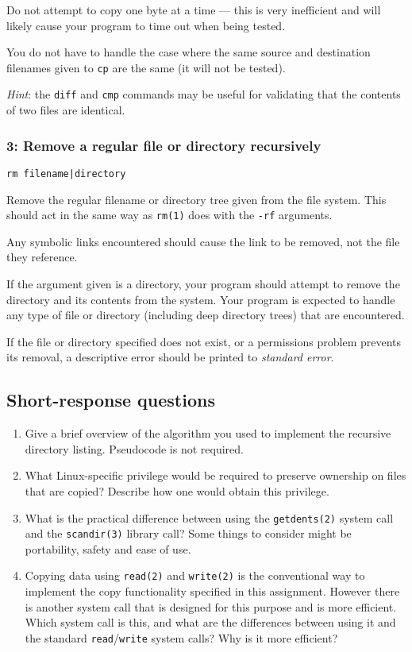 \documentclass[12pt,a4paper]{article}
\begin{document}
Do not attempt to copy one byte at a time --- this is very inefficient and will
likely cause your program to time out when being tested.

You do not have to handle the case where the same source and destination filenames
given to \texttt{cp} are the same (it will not be tested).

\textit{Hint}: the \texttt{diff} and \texttt{cmp} commands may be useful for
validating that the contents of two files are identical.

\subsubsection*{3: Remove a regular file or directory recursively}

\texttt{rm filename|directory}

Remove the regular filename or directory tree given from the file system. This
should act in the same way as \texttt{rm(1)} does with the \texttt{-rf}
arguments.

Any symbolic links encountered should cause the link to be removed, not the
file they reference.

If the argument given is a directory, your program should attempt to remove the
directory and its contents from the system. Your program is expected to handle
any type of file or directory (including deep directory trees) that are
encountered.

If the file or directory specified does not exist, or a permissions problem
prevents its removal, a descriptive error should be printed to \textit{standard
error}.

\subsection*{Short-response questions}

\begin{enumerate}
    \item Give a brief overview of the algorithm you used to implement the recursive directory listing. Pseudocode is not required.
    \item What Linux-specific privilege would be required to preserve ownership on files that are copied? Describe how one would obtain this privilege.
    \item What is the practical difference between using the \texttt{getdents(2)} system call and the \texttt{scandir(3)} library call? Some things to consider might be portability, safety and ease of use.
    \item Copying data using \texttt{read(2)} and \texttt{write(2)} is the conventional way to implement the copy functionality specified in this assignment. However there is another system call that is designed for this purpose and is more efficient. Which system call is this, and what are the differences between using it and the standard \texttt{read}\slash \texttt{write} system calls? Why is it more efficient?
\end{enumerate}
\end{document}
